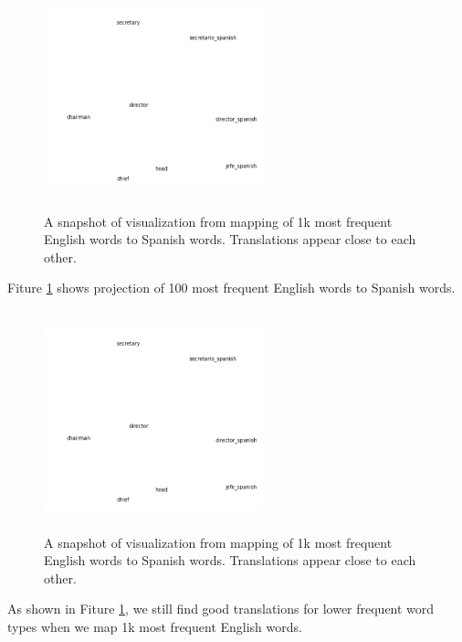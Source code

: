 \begin{figure}[!ht]
  \centering
  \includegraphics[width=2.5in,height=2.5in]{viz_top1000.png}
  \caption{A snapshot of visualization from mapping of 1k most frequent English words to Spanish words. Translations appear close to each other.}
\label{viz_top100}
\end{figure}

Fiture \ref{viz_top100} shows projection of 100 most frequent English words to Spanish words. 


 \begin{figure}[!ht]
  \centering
  \includegraphics[width=2.5in,height=2.5in]{viz_top1000.png}
  \caption{A snapshot of visualization from mapping of 1k most frequent English words to Spanish words. Translations appear close to each other.}
\label{viz_top1000}
\end{figure}

As shown in Fiture \ref{viz_top100}, we still find good translations for lower frequent word types when we map 1k most frequent English words. 